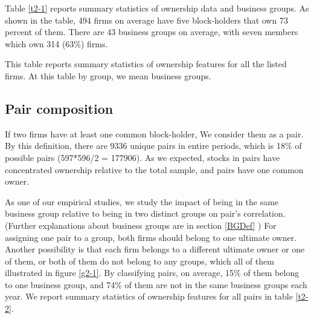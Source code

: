 \documentclass[12pt, a4paper]{article}
\begin{document}
Table \ref{t2-1} reports summary statistics of ownership data and business groups. As shown in the table, 494 firms on average have five block-holders that own 73 percent of them. There are 43 business groups on average, with seven members which own 314 (63\%) firms. 
\normalcolor

 \begin{table}[htbp]
        \centering
        \caption{ This table reports summary statistics of ownership features for all the listed firms. At this table by group, we mean business groups.}
        \label{t2-1}
        \resizebox{1\textwidth}{!}
        {
        
         }
      \end{table}

\subsection{Pair composition }

  If two firms have at least one common block-holder, We consider them as a pair. By this definition, there are 9336  unique pairs in entire periods, which is 18\% of possible pairs (597*596/2 = 177906). As we expected, stocks in pairs have concentrated ownership relative to the total sample, and pairs have one common owner.
  
  \normalcolor
  
As one of our empirical studies, we study the impact of being in the same business group relative to being in two distinct groups on pair's correlation. (Further explanations about business groups are in section \ref{BGDef} )
   For assigning one pair to a group, both firms should belong to one ultimate owner. Another possibility is that each firm belongs to a different ultimate owner or one of them, or both of them do not belong to any groups, which all of them illustrated in figure \ref{g2-1}.
    By classifying pairs, on average, 15\% of them  belong to one business group, and 74\% of them are not in the same business groups  each year. We report summary statistics of ownership features for all pairs in table \ref{t2-2}.
     
\end{document}

